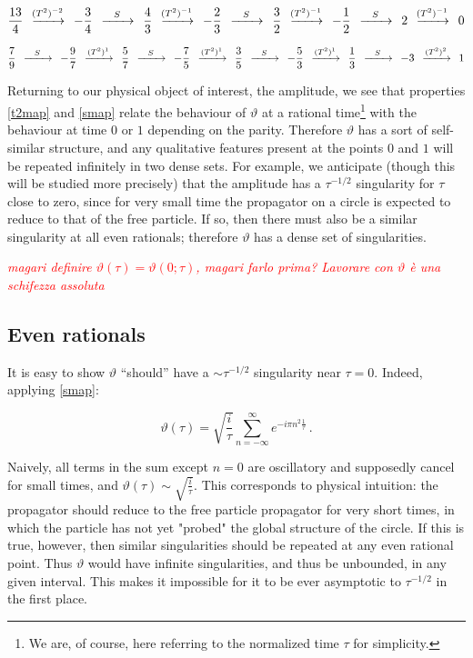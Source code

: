\documentclass{article}
\newcommand{\T}{\ensuremath{\vartheta}}
\newcommand{\cmnt}[1]{\textcolor{red}{\emph{#1}}}
\newcommand{\sumZ}{\sum_{n=-\infty}^{\infty}}
\begin{document}
\begin{equation}
    \frac{13}{4} \tapp{-2} - \frac{3}{4} \sapp \frac{4}{3} \tapp{-1} - \frac{2}{3} \sapp \frac{3}{2} \tapp{-1} -\frac{1}{2} \sapp 2 \tapp{-1} 0
\end{equation}

\begin{equation}
    \frac{7}{9} \sapp - \frac{9}{7} \tapp{1} \frac{5}{7} \sapp -\frac{7}{5} \tapp{1} \frac{3}{5} \sapp - \frac{5}{3} \tapp{1} \frac{1}{3} \sapp -3 \tapp{2} 1
\end{equation}

Returning to our physical object of interest, the amplitude, we see that properties \eqref{t2map} and \eqref{smap} relate the behaviour of $\T$ at a rational time\footnote{We are, of course, here referring to the normalized time $\tau$ for simplicity.} with the behaviour at time $0$ or $1$ depending on the parity. Therefore $\T$ has a sort of self-similar structure, and any qualitative features present at the points $0$ and $1$ will be repeated infinitely in two dense sets. For example, we anticipate (though this will be studied more precisely) that the amplitude has a $\tau^{-1/2}$ singularity for $\tau$ close to zero, since for very small time the propagator on a circle is expected to reduce to that of the free particle. If so, then there must also be a similar singularity at all even rationals; therefore $\T$ has a dense set of singularities.

\cmnt{magari definire $\vartheta(\tau) = \vartheta(0;\tau)$, magari farlo prima? Lavorare con $\T$ è una schifezza assoluta}


\subsection{Even rationals}

It is easy to show $\T$ ``should'' have a $\sim \tau^{-1/2}$ singularity near $\tau = 0$. Indeed, applying  \eqref{smap}:

\begin{equation}
    \vartheta(\tau) = \sqrt{\frac{i}{\tau}} \sumZ e^{-i\pi n^2 \frac{1}{\tau}}\,.
\end{equation}

Naively, all terms in the sum except $n=0$ are oscillatory and supposedly cancel for small times, and $\vartheta(\tau) \sim \sqrt{\frac{i}{\tau}}$. This corresponds to physical intuition: the propagator should reduce to the free particle propagator for very short times, in which the particle has not yet "probed" the global structure of the circle. If this is true, however, then similar singularities should be repeated at any even rational point. Thus $\T$ would have infinite singularities, and thus be unbounded, in any given interval. This makes it impossible for it to be ever asymptotic to $\tau^{-1/2}$ in the first place.
\end{document}
